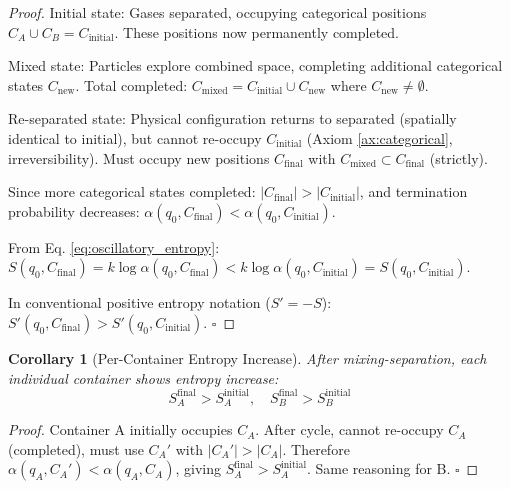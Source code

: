 \documentclass[11pt,a4paper]{article}
\newtheorem{corollary}[theorem]{Corollary}
\theoremstyle{definition}
\theoremstyle{remark}
\begin{document}
\begin{proof}
Initial state: Gases separated, occupying categorical positions $C_A \cup C_B = C_{\text{initial}}$. These positions now permanently completed.

Mixed state: Particles explore combined space, completing additional categorical states $C_{\text{new}}$. Total completed: $C_{\text{mixed}} = C_{\text{initial}} \cup C_{\text{new}}$ where $C_{\text{new}} \neq \emptyset$.

Re-separated state: Physical configuration returns to separated (spatially identical to initial), but cannot re-occupy $C_{\text{initial}}$ (Axiom \ref{ax:categorical}, irreversibility). Must occupy new positions $C_{\text{final}}$ with $C_{\text{mixed}} \subset C_{\text{final}}$ (strictly).

Since more categorical states completed: $|C_{\text{final}}| > |C_{\text{initial}}|$, and termination probability decreases: $\alpha(q_0, C_{\text{final}}) < \alpha(q_0, C_{\text{initial}})$.

From Eq. \eqref{eq:oscillatory_entropy}: $S(q_0, C_{\text{final}}) = k \log \alpha(q_0, C_{\text{final}}) < k \log \alpha(q_0, C_{\text{initial}}) = S(q_0, C_{\text{initial}})$.

In conventional positive entropy notation ($S' = -S$): $S'(q_0, C_{\text{final}}) > S'(q_0, C_{\text{initial}})$. $\square$
\end{proof}

\begin{corollary}[Per-Container Entropy Increase]
After mixing-separation, each individual container shows entropy increase:
\begin{equation}
S_A^{\text{final}} > S_A^{\text{initial}}, \quad S_B^{\text{final}} > S_B^{\text{initial}}
\end{equation}
\end{corollary}

\begin{proof}
Container A initially occupies $C_A$. After cycle, cannot re-occupy $C_A$ (completed), must use $C_A'$ with $|C_A'| > |C_A|$. Therefore $\alpha(q_A, C_A') < \alpha(q_A, C_A)$, giving $S_A^{\text{final}} > S_A^{\text{initial}}$. Same reasoning for B. $\square$
\end{proof}
\end{document}
